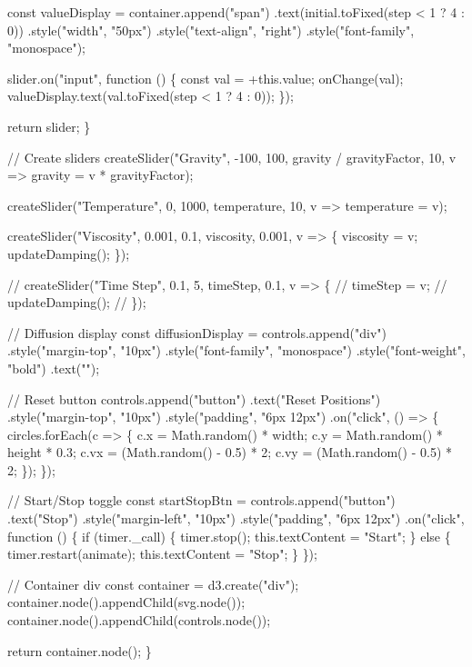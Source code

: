 \documentclass[
  letterpaper,
  enabledeprecatedfontcommands]{report}
\newenvironment{Shaded}{\begin{snugshade}}{\end{snugshade}}
\newcommand{\NormalTok}[1]{\textcolor[rgb]{0.00,0.23,0.31}{#1}}
\begin{document}
\begin{Shaded}
\begin{Highlighting}[]
\NormalTok{  const valueDisplay = container.append("span")}
\NormalTok{    .text(initial.toFixed(step \textless{} 1 ? 4 : 0))}
\NormalTok{    .style("width", "50px")}
\NormalTok{    .style("text{-}align", "right")}
\NormalTok{    .style("font{-}family", "monospace");}

\NormalTok{  slider.on("input", function () \{}
\NormalTok{    const val = +this.value;}
\NormalTok{    onChange(val);}
\NormalTok{    valueDisplay.text(val.toFixed(step \textless{} 1 ? 4 : 0));}
\NormalTok{  \});}

\NormalTok{  return slider;}
\NormalTok{\}}

\NormalTok{// Create sliders}
\NormalTok{createSlider("Gravity", {-}100, 100, gravity / gravityFactor, 10, v =\textgreater{} gravity = v * gravityFactor);}

\NormalTok{createSlider("Temperature", 0, 1000, temperature, 10, v =\textgreater{} temperature = v);}

\NormalTok{createSlider("Viscosity", 0.001, 0.1, viscosity, 0.001, v =\textgreater{} \{}
\NormalTok{  viscosity = v;}
\NormalTok{  updateDamping();}
\NormalTok{\});}

\NormalTok{// createSlider("Time Step", 0.1, 5, timeStep, 0.1, v =\textgreater{} \{}
\NormalTok{//   timeStep = v;}
\NormalTok{//   updateDamping();}
\NormalTok{// \});}

\NormalTok{// Diffusion display}
\NormalTok{const diffusionDisplay = controls.append("div")}
\NormalTok{  .style("margin{-}top", "10px")}
\NormalTok{  .style("font{-}family", "monospace")}
\NormalTok{  .style("font{-}weight", "bold")}
\NormalTok{  .text("");}

\NormalTok{// Reset button}
\NormalTok{controls.append("button")}
\NormalTok{  .text("Reset Positions")}
\NormalTok{  .style("margin{-}top", "10px")}
\NormalTok{  .style("padding", "6px 12px")}
\NormalTok{  .on("click", () =\textgreater{} \{}
\NormalTok{    circles.forEach(c =\textgreater{} \{}
\NormalTok{      c.x = Math.random() * width;}
\NormalTok{      c.y = Math.random() * height * 0.3;}
\NormalTok{      c.vx = (Math.random() {-} 0.5) * 2;}
\NormalTok{      c.vy = (Math.random() {-} 0.5) * 2;}
\NormalTok{    \});}
\NormalTok{  \});}

\NormalTok{// Start/Stop toggle}
\NormalTok{const startStopBtn = controls.append("button")}
\NormalTok{  .text("Stop")}
\NormalTok{  .style("margin{-}left", "10px")}
\NormalTok{  .style("padding", "6px 12px")}
\NormalTok{  .on("click", function () \{}
\NormalTok{    if (timer.\_call) \{}
\NormalTok{      timer.stop();}
\NormalTok{      this.textContent = "Start";}
\NormalTok{    \} else \{}
\NormalTok{      timer.restart(animate);}
\NormalTok{      this.textContent = "Stop";}
\NormalTok{    \}}
\NormalTok{  \});}

\NormalTok{// Container div}
\NormalTok{const container = d3.create("div");}
\NormalTok{container.node().appendChild(svg.node());}
\NormalTok{container.node().appendChild(controls.node());}

\NormalTok{return container.node();}
\NormalTok{\}}
\end{Highlighting}
\end{Shaded}
\end{document}
